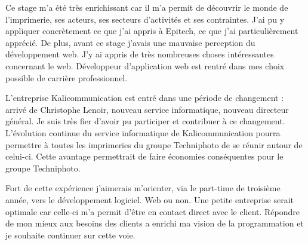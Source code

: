 \vspace*{2cm}
Ce stage m'a été très enrichissant car il m'a permit de découvrir le monde de l'imprimerie, ses acteurs, ses secteurs d'activités et ses contraintes. J'ai pu y appliquer concrètement ce que j'ai appris à Epitech, ce que j'ai particulièrement apprécié. De plus, avant ce stage j'avais une mauvaise perception du développement web. J'y ai appris de très nombreuses choses intéressantes concernant le web. Développeur d'application web est rentré dans mes choix possible de carrière professionnel.\newline

L'entreprise Kalicommunication est entré dans une période de changement : arrivé de Christophe Lenoir, nouveau service informatique, nouveau directeur général. Je suis très fier d'avoir pu participer et contribuer à ce changement. L'évolution continue du service informatique de Kalicommunication pourra permettre à toutes les imprimeries du groupe Techniphoto de se réunir autour de celui-ci. Cette avantage permettrait de faire économies conséquentes pour le groupe Techniphoto.\newline

Fort de cette expérience j'aimerais m'orienter, via le part-time de troisième année, vers le développement logiciel. Web ou non. Une petite entreprise serait optimale car celle-ci m'a permit d'être en contact direct avec le client. Répondre de mon mieux aux besoins des clients a enrichi ma vision de la programmation et je souhaite continuer sur cette voie.